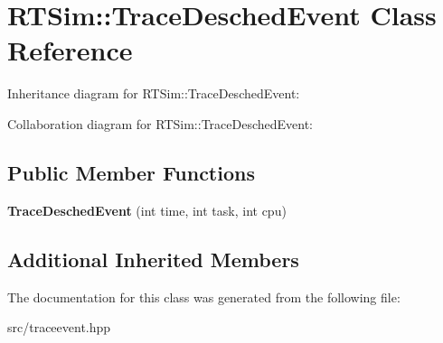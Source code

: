 \hypertarget{classRTSim_1_1TraceDeschedEvent}{}\section{R\+T\+Sim\+:\+:Trace\+Desched\+Event Class Reference}
\label{classRTSim_1_1TraceDeschedEvent}


Inheritance diagram for R\+T\+Sim\+:\+:Trace\+Desched\+Event\+:


Collaboration diagram for R\+T\+Sim\+:\+:Trace\+Desched\+Event\+:
\subsection*{Public Member Functions}
\begin{DoxyCompactItemize}
\item 
{\bfseries Trace\+Desched\+Event} (int time, int task, int cpu)\hypertarget{classRTSim_1_1TraceDeschedEvent_af6cfda290a281d7cd89f63cdc73ec816}{}\label{classRTSim_1_1TraceDeschedEvent_af6cfda290a281d7cd89f63cdc73ec816}

\end{DoxyCompactItemize}
\subsection*{Additional Inherited Members}


The documentation for this class was generated from the following file\+:\begin{DoxyCompactItemize}
\item 
src/traceevent.\+hpp\end{DoxyCompactItemize}
